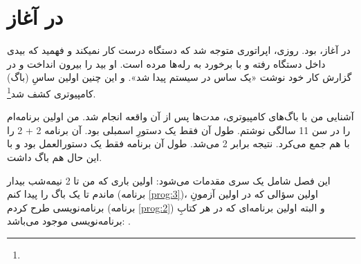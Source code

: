 \chapter[در آغاز]{در آغاز\protect{}}
در آغاز،  بود. روزی، اپراتوری متوجه شد که دستگاه درست کار نمیکند و فهمید که بیدی داخل دستگاه رفته و با برخورد به رله‌ها مرده است. او بید را بیرون انداخت و در گزارش کار خود نوشت «یک ساس در سیستم پیدا شد». و این چنین اولین ساسِ (باگ) کامپیوتری کشف شد\footnote{}.

آشنایی من با باگ‌های کامپیوتری، مدت‌ها پس از آن واقعه انجام شد. من اولین برنامه‌ام را در سن 11 سالگی نوشتم. طول آن فقط یک دستورِ اسمبلی بود. آن برنامه 2 + 2 را با هم جمع می‌کرد. نتیجه برابر 2 می‌شد. طول آن برنامه فقط یک دستورالعمل بود و با این حال هم باگ داشت.

این فصل شامل یک سری مقدمات می‌شود: اولین باری که من تا 2 نیمه‌شب بیدار ماندم تا یک باگ را پیدا کنم (برنامه \ref{prog:3})، اولین سؤالی که در اولین آزمونِ برنامه‌نویسی  طرح کردم (برنامه \ref{prog:2}) و البته اولین برنامه‌ای که در هر کتابِ برنامه‌نویسی موجود می‌باشد: .

